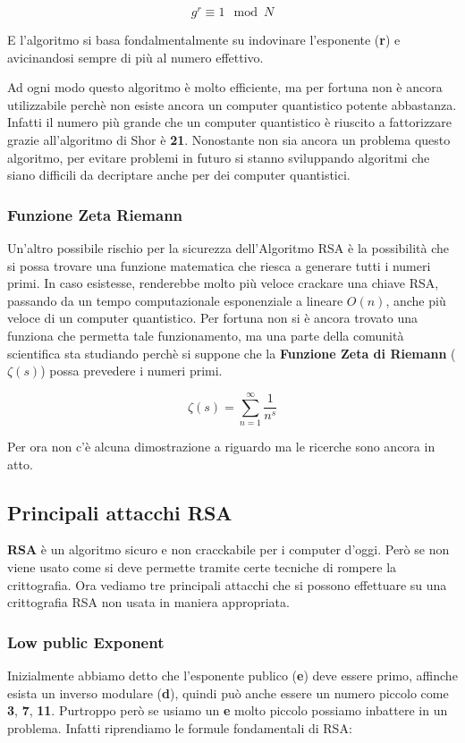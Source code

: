 \documentclass{rapport}
\begin{document}
 \begin{equation*}
    g^{r} \equiv 1 \mod N
\end{equation*}

E l'algoritmo si basa fondalmentalmente su indovinare l'esponente (\textbf{r}) e avicinandosi sempre di più al numero effettivo. 

Ad ogni modo questo algoritmo è molto efficiente, ma per fortuna non è ancora utilizzabile perchè non esiste ancora un computer quantistico potente abbastanza. Infatti il numero più grande che un computer quantistico è riuscito a fattorizzare grazie all'algoritmo di Shor è \textbf{21}. Nonostante non sia ancora un problema questo algoritmo, per evitare problemi in futuro si stanno sviluppando algoritmi che siano difficili da decriptare anche per dei computer quantistici. 

\subsubsection{Funzione Zeta Riemann}
Un'altro possibile rischio per la sicurezza dell'Algoritmo RSA è la possibilità che si possa trovare una funzione matematica che riesca a generare tutti i numeri primi. In caso esistesse, renderebbe molto più veloce crackare una chiave RSA, passando da un tempo computazionale esponenziale a lineare $O(n)$, anche più veloce di un computer quantistico. Per fortuna non si è ancora trovato una funziona che permetta tale funzionamento, ma una parte della comunità scientifica sta studiando perchè si suppone che la \textbf{Funzione Zeta di Riemann} (\textbf{$\zeta(s)$}) possa prevedere i numeri primi.

\begin{equation*}
    \zeta(s) = \sum_{n=1}^{\infty}\frac{1}{n^s}
\end{equation*}

Per ora non c'è alcuna dimostrazione a riguardo ma le ricerche sono ancora in atto.
\newpage
\subsection{Principali attacchi RSA}
\textbf{RSA} è un algoritmo sicuro e non cracckabile per i computer d'oggi. Però se non viene usato come si deve permette tramite certe tecniche di rompere la crittografia. Ora vediamo tre principali attacchi che si possono effettuare su una crittografia RSA non usata in maniera appropriata.


\subsubsection{Low public Exponent}
Inizialmente abbiamo detto che l'esponente publico (\textbf{e}) deve essere primo, affinche esista un inverso modulare (\textbf{d}), quindi può anche essere un numero piccolo come \textbf{3}, \textbf{7}, \textbf{11}. Purtroppo però se usiamo un \textbf{e} molto piccolo possiamo inbattere in un problema. Infatti riprendiamo le formule fondamentali di RSA:
\end{document}
